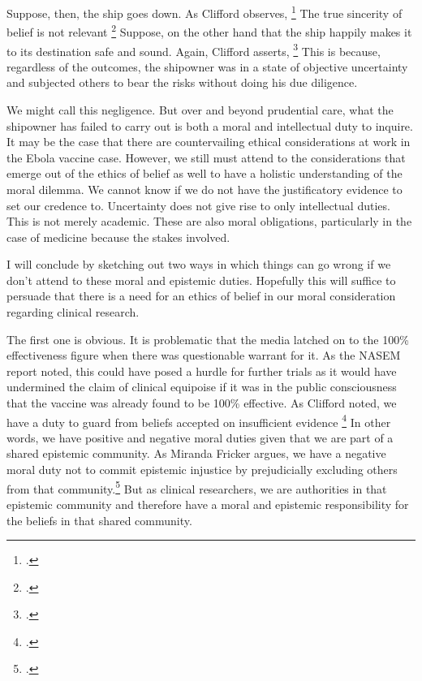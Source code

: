 \documentclass[letterpaper,notitlepage,12pt]{article}
\begin{document}
Suppose, then, the ship goes down.
As Clifford observes, \footcite{Clifford 1877 339}
The true sincerity of belief is not relevant \footcite{Clifford
  340}
Suppose, on the other hand that the ship happily makes it to its destination
safe and sound.
Again, Clifford asserts, \footcite{340}
This is because, regardless of the outcomes, the shipowner was in a state of
objective uncertainty and subjected others to bear the risks without
doing his due diligence.

We might call this negligence.
But over and beyond prudential care, what the shipowner has failed to carry out
is both a moral and intellectual duty to inquire.
It may be the case that there are countervailing ethical considerations at work
in the Ebola vaccine case.
However, we still must attend to the considerations that emerge out of the
ethics of belief as well to have a holistic understanding of the moral dilemma.
We cannot know if we do not have the justificatory evidence to set our credence
to.
Uncertainty does not give rise to only intellectual duties.
This is not merely academic.
These are also moral obligations, particularly in the case of medicine because
the stakes involved.

I will conclude by sketching out two ways in which things can go wrong if we
don't attend to these moral and epistemic duties.
Hopefully this will suffice to persuade that there is a need for an ethics of
belief in our moral consideration regarding clinical research.

The first one is obvious.
It is problematic that the media latched on to the 100\% effectiveness figure when
there was questionable warrant for it.
As the NASEM report noted, this could have posed a hurdle for further
trials as it would have undermined the claim of clinical equipoise if it was in
the public consciousness that the vaccine was already found to be 100\%
effective.
As Clifford noted, we have a duty to guard from beliefs accepted on insufficient
evidence \footcite{344}
In other words, we have positive and negative moral duties given that we are
part of a shared epistemic community.
As Miranda Fricker argues, we have a negative moral duty not to commit epistemic
injustice by prejudicially excluding others from that
community.\footcite{fricker}
But as clinical researchers, we are authorities in that epistemic community and
therefore have a moral and epistemic responsibility for the beliefs in that
shared community.
\end{document}
